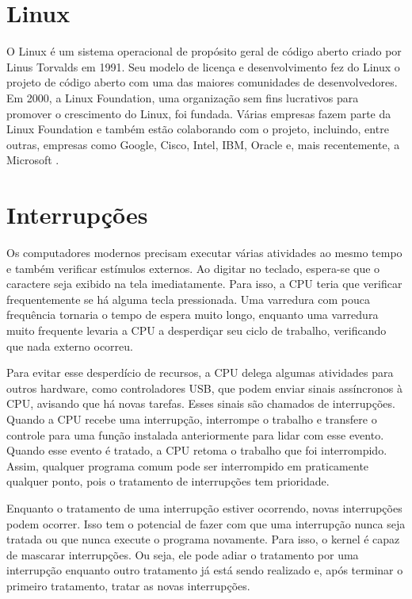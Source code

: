 \section{Linux}

O Linux é um sistema operacional de propósito geral de código aberto criado por Linus Torvalds em 1991. Seu modelo de licença e desenvolvimento fez do Linux o projeto de código aberto com uma das maiores comunidades de desenvolvedores. Em 2000, a Linux Foundation, uma organização sem fins lucrativos para promover o crescimento do Linux, foi fundada. Várias empresas fazem parte da Linux Foundation e também estão colaborando com o projeto, incluindo, entre outras, empresas como Google, Cisco, Intel, IBM, Oracle e, mais recentemente, a Microsoft \cite{LinuxFoundation}. 

\section{Interrupções}

Os computadores modernos precisam executar várias atividades ao mesmo tempo e também verificar estímulos externos. Ao digitar no teclado, espera-se que o caractere seja exibido na tela imediatamente. Para isso, a CPU teria que verificar frequentemente se há alguma tecla pressionada. Uma varredura com pouca frequência tornaria o tempo de espera muito longo, enquanto uma varredura muito frequente levaria a CPU a desperdiçar seu ciclo de trabalho, verificando que nada externo ocorreu. \cite{Rothberg2015}

Para evitar esse desperdício de recursos, a CPU delega algumas atividades para outros hardware, como controladores USB, que podem enviar sinais assíncronos à CPU, avisando que há novas tarefas. Esses sinais são chamados de interrupções. Quando a CPU recebe uma interrupção, interrompe o trabalho e transfere o controle para uma função instalada anteriormente para lidar com esse evento. Quando esse evento é tratado, a CPU retoma o trabalho que foi interrompido. Assim, qualquer programa comum pode ser interrompido em praticamente qualquer ponto, pois o tratamento de interrupções tem prioridade. \cite{LinuxDeviceDrivers}

Enquanto o tratamento de uma interrupção estiver ocorrendo, novas interrupções podem ocorrer. Isso tem o potencial de fazer com que uma interrupção nunca seja tratada ou que nunca execute o programa novamente. Para isso, o kernel é capaz de mascarar interrupções. Ou seja, ele pode adiar o tratamento por uma interrupção enquanto outro tratamento já está sendo realizado e, após terminar o primeiro tratamento, tratar as novas interrupções.

